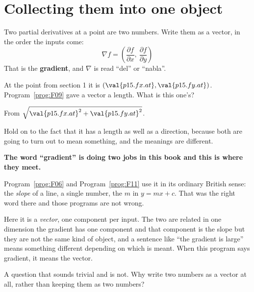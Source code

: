 \section{Collecting them into one object}
\label{sec:P15-gradient}

\begin{fr}
Two partial derivatives at a point are two numbers. Write them as a vector,
in the order the inputs come:
\[ \nabla f = \left(\frac{\partial f}{\partial x},\
                    \frac{\partial f}{\partial y}\right) \]
That is the \textbf{gradient}, and $\nabla$ is read \enquote{del} or
\enquote{nabla}.

At the point from section 1 it is $(\val{p15.fx.at}, \val{p15.fy.at})$.
Program~\ref{prog:F09} gave a vector a length. What is this one's?
\dotline
\nextframe
\end{fr}

\begin{fr}
From $\sqrt{\val{p15.fx.at}^{2} + \val{p15.fy.at}^{2}}$.

Hold on to the fact that it has a length as well as a direction, because both
are going to turn out to mean something, and the meanings are different.

\begin{notationbox}
\textbf{The word \enquote{gradient} is doing two jobs in this book and this is
where they meet.}

Program~\ref{prog:F06} and Program~\ref{prog:F11} use it in its ordinary
British sense: the \emph{slope} of a line, a single number, the $m$ in
$y = mx + c$. That was the right word there and those programs are not wrong.

Here it is a \emph{vector}, one component per input. The two are related
\dash{} in one dimension the gradient has one component and that component is
the slope \dash{} but they are not the same kind of object, and a sentence
like \enquote{the gradient is large} means something different depending on
which is meant. When this program says gradient, it means the vector.
\end{notationbox}
\end{fr}

\begin{fr}
A question that sounds trivial and is not. Why write two numbers as a vector
at all, rather than keeping them as two numbers?
\dotline
\nextframe
\end{fr}

